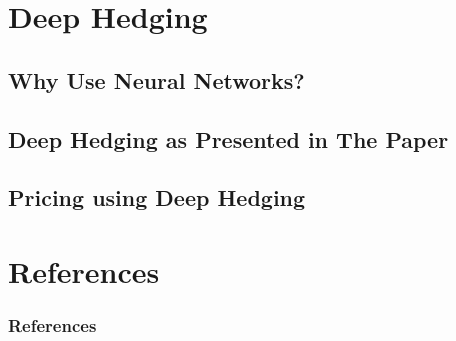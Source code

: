 \documentclass[serif]{beamer}
\begin{document}
\section{Deep Hedging}

\subsection{Why Use Neural Networks?}
\subsection{Deep Hedging as Presented in The Paper}
\subsection{Pricing using Deep Hedging}

\section{References}
\begin{frame}
    \frametitle{References}
    
    
\end{frame}
\end{document}
